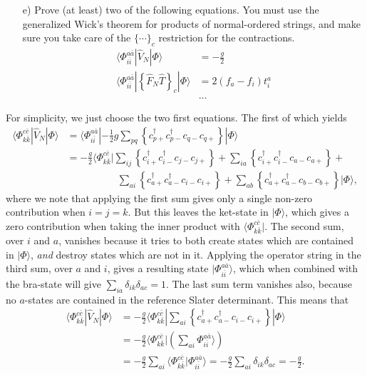 \documentclass[a4paper]{article}
\newcommand{\nn}{\nonumber}
\newcommand{\cppd}{c_{p+}^\dagger}
\newcommand{\cpmd}{c_{p-}^\dagger}
\newcommand{\cqp}{c_{q+}}
\newcommand{\cqm}{c_{q-}}
\begin{document}
\begin{exframe}
\begin{itemize}
  \item[e)] Prove (at least) two of the following equations. You must use the generalized Wick's theorem for products of normal-ordered strings, and make sure you take care of the $\{\cdots\}_c$ restriction for the contractions.
  \begin{align}
  \langle \Phi_{i\bar i}^{a\bar a} |\hat V_N |\Phi\rangle &= -\frac{g}{2} \\
  \langle \Phi_{i\bar i}^{a\bar a} |\left\{\hat F_N \hat T  \right\}_c |\Phi\rangle &= 2(f_a - f_i)t_i^a \\
  & \dots \nn
  \end{align}
\end{itemize}
\end{exframe}
For simplicity, we just choose the two first equations. The first of which yields
\begin{align}
\langle \Phi_{k\bar k}^{c\bar c}| \hat V_N | \Phi\rangle &= \langle \Phi_{i\bar i}^{a\bar a}| -\frac{1}{2}g \sum_{pq} \left\{ \cppd \cpmd \cqm \cqp \right\} | \Phi\rangle \nn\\
%
&= -\frac{g}{2}\langle \Phi_{k\bar k}^{c\bar c}| \sum_{ij} \left\{ c_{i+}^\dagger c_{i-}^\dagger c_{j-}c_{j+} \right\} + \sum_{ia} \left\{ c_{i+}^\dagger c_{i-}^\dagger c_{a-}c_{a+} \right\} + \nn\\
%
& \ \ \ \ \ \ \ \ \ \ \ \ \ \ \ \ \ \ \ \ \ \ \ \sum_{ai} \left\{ c_{a+}^\dagger c_{a-}^\dagger c_{i-}c_{i+} \right\} + \sum_{ab} \left\{ c_{a+}^\dagger c_{a-}^\dagger c_{b-}c_{b+} \right\}| \Phi\rangle,
\end{align}
where we note that applying the first sum gives only a single non-zero contribution when $i=j=k$. But this leaves the ket-state in $|\Phi\rangle$, which gives a zero contribution when taking the inner product with $\langle \Phi_{k \bar k}^{c\bar c}|$. The second sum, over $i$ and $a$, vanishes because it tries to both create states which are contained in $|\Phi\rangle$, \emph{and} destroy states which are not in it. Applying the operator string in the third sum, over $a$ and $i$, gives a resulting state $|\Phi_{i\bar i}^{a\bar a}\rangle$, which when combined with the bra-state will give $\sum_{ia}\delta_{ik}\delta_{ac}=1$. The last sum term vanishes also, because no $a$-states are contained in the reference Slater determinant. This means that
\begin{align}
\langle \Phi_{k\bar k}^{c\bar c}| \hat V_N | \Phi\rangle &= -\frac{g}{2} \langle \Phi_{k\bar k}^{c\bar c}| \sum_{ai} \left\{ c_{a+}^\dagger c_{a-}^\dagger c_{i-}c_{i+} \right\} | \Phi\rangle \nn\\
%
&= -\frac{g}{2}\langle \Phi_{k\bar k}^{c\bar c}| \left(\sum_{ai} \Phi_{i\bar i}^{a\bar a}\rangle \right) \nn\\
%
&= -\frac{g}{2}\sum_{ai} \langle \Phi_{k\bar k}^{c\bar c}|\Phi_{i\bar i}^{a\bar a}\rangle = -\frac{g}{2}\sum_{ai}\delta_{ik}\delta_{ac} = -\frac{g}{2}.
\end{align}
\end{document}
